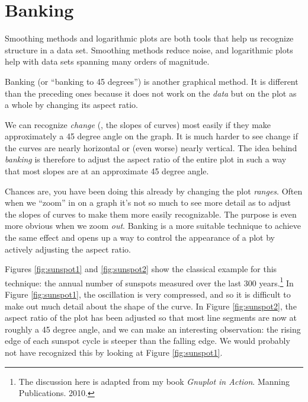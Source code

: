 


\setcounter{footnote}{1}
\section{Banking}


Smoothing methods and logarithmic plots are both tools that help us 
recognize structure in a data set. Smoothing methods reduce noise, and
logarithmic plots help with data sets spanning many orders of
magnitude.

Banking (or ``banking to 45 degrees'') is another graphical method.
It is different than the preceding ones because it does not work on
the \emph{data} but on the plot as a whole by changing its aspect
ratio.

We can recognize \emph{change} (\ie, the slopes of curves) most
easily if they make approximately a 45 degree angle on the graph. It
is much harder to see change if the curves are nearly horizontal or
(even worse) nearly vertical. The idea behind \emph{banking} is
therefore to adjust the aspect ratio of the entire plot in such a way
that most slopes are at an approximate 45 degree angle. 

Chances are, you have been doing this already by changing the plot
\emph{ranges}. Often when we ``zoom'' in on a graph it's not so much
to see more detail as to adjust the slopes of curves to make them more
easily recognizable. The purpose is even more obvious when we zoom
\emph{out}. Banking is a more suitable technique to achieve the same
effect and opens up a way to control the appearance of a plot by
actively adjusting the aspect ratio.

Figures \ref{fig:sunspot1} and \ref{fig:sunspot2} show the classical
example for this technique: the annual number of sunspots measured
over the last 300 years.\footnote{The discussion here is adapted from my
  book \emph{Gnuplot in Action}. Manning Publications. 2010.}  In
Figure \ref{fig:sunspot1}, the oscillation is very compressed, and so
it is difficult to make out much detail about the shape of the curve.
In Figure \ref{fig:sunspot2}, the aspect ratio of the plot has been
adjusted so that most line segments are now at roughly a 45 degree
angle, and we can make an interesting observation: the rising edge of
each sunspot cycle is steeper than the falling edge. We would probably
not have recognized this by looking at Figure \ref{fig:sunspot1}.

